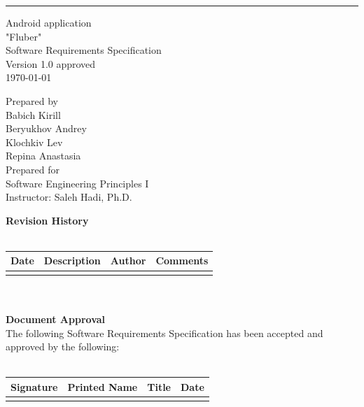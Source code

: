 \documentclass{scrreprt}
\date{}
\def\myversion{1.0 }
\begin{document}
	
\begin{flushright}
   \rule{16cm}{5pt}\vskip1cm
    \begin{bfseries}
        \thispagestyle{empty} %
        \begin{center}
        \Huge{Android application\\ "Fluber"\\}
        \vspace{1cm}
        \Huge{Software Requirements Specification}\\
        \vspace{1cm}  
        \LARGE{Version \myversion approved}\\
        \vspace{1cm}        
        \today\\
        \vspace{1cm}
        \end{center}
       \begin{center}
        Prepared by \\        
        Babich Kirill\\
        Beryukhov Andrey\\
        Klochkiv Lev\\
        Repina Anastasia\\
        \vspace{1cm}         
        Prepared for\\
        Software Engineering Principles I
\\
        Instructor: Saleh Hadi, Ph.D.
         \end{center}
    \end{bfseries}
\end{flushright}

\newpage

\textbf{Revision History}\\\\
\begin{tabular}{| p{} |
		p{} |
		p{} |
		p{} |}
	\hline\textbf{Date}&\textbf{Description}&\textbf{Author}&\textbf{Comments}\\
	\hline
	      &   &  &    \\
	\hline
\end{tabular}\\\\
\textbf{Document Approval}\\
The following Software Requirements Specification has been accepted and approved by the following: \\\\
\begin{tabular}{| p{} |
		p{} |
		p{} |
		p{} |}
	\hline\textbf{Signature}&\textbf{Printed Name}&\textbf{Title}&\textbf{Date}\\
	\hline
	&   &  &    \\
	\hline
\end{tabular}
\end{document}
